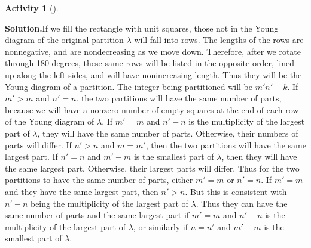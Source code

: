 \documentclass[10pt,]{book}
\theoremstyle{plain}
\theoremstyle{definition}
\newtheorem{activity}[project]{Activity}
\numberwithin{equation}{chapter}
\begin{document}
\begin{activity}[]
\begin{enumerate}[label=(\alph*)]
\textbf{Solution.}\quad If we fill the rectangle with unit squares, those not in the Young diagram of the original partition \(\lambda\) will fall into rows.  The lengths of the rows are nonnegative, and are nondecreasing as we move down. Therefore, after we rotate through 180 degrees, these same rows will be listed in the opposite order, lined up along the left sides, and will have nonincreasing length. Thus they will be the Young diagram of a partition. The integer being partitioned will be \(m'n'-k\). If \(m'>m\) and \(n'=n\). the two partitions will have the same number of parts, because we will have a nonzero number of empty squares at the end of each row of the Young diagram of \(\lambda\). If \(m'=m\) and \(n'-n\) is the multiplicity of the largest part of \(\lambda\), they will have the same number of parts. Otherwise, their numbers of parts will differ. If \(n'>n\) and \(m=m'\), then the two partitions will have the same largest part. If \(n'=n\) and \(m'-m\) is the smallest part of \(\lambda\), then they will have the same largest part. Otherwise, their largest parts will differ. Thus for the two partitions to have the same number of parts, either \(m'=m\) or \(n'=n\). If \(m'=m\) and they have the same largest part, then \(n'>n\). But this is consistent with \(n'-n\) being the multiplicity of the largest part of \(\lambda\). Thus they can have the same number of parts and the same largest part if \(m'=m\) and \(n'-n\) is the multiplicity of the largest part of \(\lambda\), or similarly if \(n=n'\) and \(m'-m\) is the smallest part of \(\lambda\).%

\end{enumerate}
\end{activity}
\end{document}
